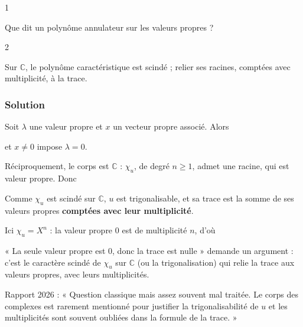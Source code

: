 \documentclass[11pt,a4paper]{article}
\newcommand{\equationajustee}[1]{%
  \sbox{\boiteequation}{$\displaystyle #1$}%
  \ifdim\wd\boiteequation>\linewidth
    \[\resizebox{\linewidth}{!}{\usebox{\boiteequation}}\]%
  \else
    \[#1\]%
  \fi}
\begin{document}
\begin{indication}{1}

Que dit un polynôme annulateur sur les valeurs propres ?

\end{indication}

\begin{indication}{2}

Sur \(\mathbb C\), le polynôme caractéristique est scindé ; relier ses racines, comptées avec multiplicité, à la trace.

\end{indication}

\hypertarget{solution}{%
\subsubsection{Solution}\label{solution}}

Soit \(\lambda\) une valeur propre et \(x\) un vecteur propre associé. Alors

\equationajustee{u^2(x)=\lambda^2x=0,}

et \(x\neq0\) impose \(\lambda=0\).

Réciproquement, le corps est \(\mathbb C\) : \(\chi_u\), de degré \(n\geqslant1\), admet une racine, qui est valeur propre. Donc

\equationajustee{\boxed{\operatorname{Sp}(u)=\{0\}.}}

Comme \(\chi_u\) est scindé sur \(\mathbb C\), \(u\) est trigonalisable, et sa trace est la somme de ses valeurs propres \textbf{comptées avec leur multiplicité}.

Ici \(\chi_u=X^n\) : la valeur propre \(0\) est de multiplicité \(n\), d'où

\equationajustee{\boxed{\operatorname{tr}(u)=n\times0=0.}}

\begin{piege}

« La seule valeur propre est \(0\), donc la trace est nulle » demande un argument : c'est le caractère scindé de \(\chi_u\) sur \(\mathbb C\) (ou la trigonalisation) qui relie la trace aux valeurs propres, avec leurs multiplicités.

\end{piege}

\begin{jury}

Rapport 2026 : « Question classique mais assez souvent mal traitée. Le corps des complexes est rarement mentionné pour justifier la trigonalisabilité de \(u\) et les multiplicités sont souvent oubliées dans la formule de la trace. »

\end{jury}
\end{document}
